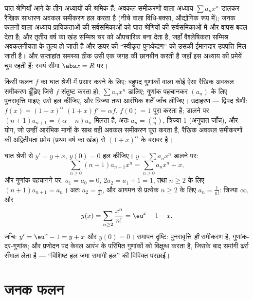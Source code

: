\begin{remark}[यह कहाँ काम आता है]
घात श्रेणियाँ आगे के तीन अध्यायों की श्रमिक हैं: अवकल समीकरणों वाला अध्याय
$\sum a_nx^n$ डालकर रैखिक साधारण अवकल समीकरण हल करता है (नीचे वाला विधि-बक्सा,
औद्योगिक रूप में); जनक फलनों वाला अध्याय प्रायिकताओं की सर्वसमिकाओं को घात
श्रेणियों की सर्वसमिकाओं में और वापस बदल देता है; और तृतीय वर्ष का खंड
सम्मिश्र चर को औपचारिक बना देता है, जहाँ वैश्लेषिकता सम्मिश्र अवकलनीयता के
तुल्य हो जाती है और ऊपर की ``स्वीकृत पुनःकेंद्रण'' को उसकी ईमानदार उपपत्ति
मिल जाती है। और सप्ताहांत समस्या ठीक उसी एक जगह की छानबीन करती है जहाँ इस
अध्याय की प्रमेयें चुप रहती हैं: स्वयं सीमा $\abs x = R$ पर।
\end{remark}

\begin{method}\label{met:b2:powerseries:ode}
किसी फलन $f$ का घात श्रेणी में प्रसार करने के लिए: बहुपद गुणांकों वाला
कोई ऐसा रैखिक अवकल समीकरण ढूँढ़िए जिसे $f$ संतुष्ट करता हो; $\sum a_nx^n$ डालिए;
गुणांक पहचानकर $(a_n)$ के लिए पुनरावृत्ति पाइए; उसे हल कीजिए, और त्रिज्या तथा
आरंभिक शर्तें जाँच लीजिए। उदाहरण --- द्विपद श्रेणी: $f(x) = (1+x)^\alpha$ $(1+x)f' = \alpha f$, $f(0)
= 1$ पूरा करता
है; डालने पर $(n+1)a_{n+1} = (\alpha - n)a_n$ मिलता है, अतः $a_n =
\binom{\alpha}{n}$, त्रिज्या $1$ (अनुपात जाँच), और योग,
जो उन्हीं आरंभिक मानों के साथ वही अवकल समीकरण पूरा करता है, रैखिक अवकल
समीकरणों की अद्वितीयता प्रमेय (प्रथम वर्ष का खंड) से $(1 + x)^\alpha$ के बराबर है।
\end{method}

\begin{example}[किसी प्रणोदित समीकरण पर यह विधि]\label{ex:b2:powerseries:odeforced}
घात श्रेणी से $y' = y + x$, $y(0) = 0$ हल कीजिए। $y =
\sum a_nx^n$ डालने पर:
\[
\sum_{n\geq0}(n+1)a_{n+1}x^n
= \sum_{n\geq0}a_nx^n + x ,
\]
और गुणांक पहचानने पर: $a_1 = a_0 = 0$, $2a_2 = a_1 + 1
= 1$, तथा $n \geq 2$ के लिए $(n+1)a_{n+1} = a_n$। अतः $a_2 =
\frac{1}{2!}$, और आगमन से
प्रत्येक $n \geq 2$ के लिए $a_n = \frac{1}{n!}$: त्रिज्या $\infty$, और
\[
y(x) = \sum_{n\geq2}\frac{x^n}{n!} = \eu^x - 1 - x .
\]
जाँच: $y' = \eu^x - 1 = y + x$ और $y(0) = 0$। समापन दृष्टि: पुनरावृत्ति \emph{ही} समीकरण है,
गुणांक-दर-गुणांक; और प्रणोदन पद केवल आरंभ के परिमित गुणांकों को विक्षुब्ध
करता है, जिसके बाद समांगी ढर्रा सँभाल लेता है --- ``विशिष्ट हल जमा समांगी
हल'' की विविक्त परछाईं।
\end{example}

\section{जनक फलन}

